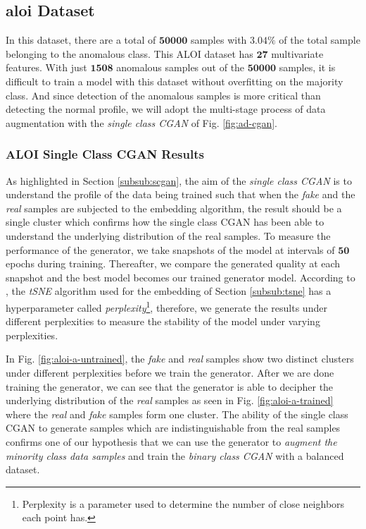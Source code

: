 \subsection{aloi Dataset}
\label{subsec:aloi}
In this dataset, there are a total of $ \bm{50000} $ samples with $ \bm{3.04\%} $ of the total sample belonging to the anomalous class. This ALOI dataset has $ \bm{27} $ multivariate features. With just $ \bm{1508} $ anomalous samples out of the $ \bm{50000} $ samples, it is difficult to train a model with this dataset without overfitting on the majority class. And since detection of the anomalous samples is more critical than detecting the normal profile, we will adopt the multi-stage process of data augmentation with the \textit{single class CGAN} of Fig. \ref{fig:ad-cgan}. 
\subsubsection{ALOI Single Class CGAN Results}
\label{subsub:aloiscgresults}
As highlighted in Section \ref{subsub:scgan}, the aim of the \textit{single class CGAN} is to understand the profile of the data being trained such that when the \textit{fake} and the \textit{real} samples are subjected to the embedding algorithm, the result should be a single cluster which confirms how the single class CGAN has been able to understand the underlying distribution of the real samples. To measure the performance of the generator, we take snapshots of the model at intervals of $ \bm{50} $ epochs during training. Thereafter, we compare the generated quality at each snapshot and the best model becomes our trained generator model. According to \cite{wattenberg2016how}, the \textit{tSNE} algorithm used for the embedding of Section \ref{subsub:tsne} has a hyperparameter called \textit{perplexity}\footnote{Perplexity is a parameter used to determine the number of close neighbors each point has.}, therefore, we generate the results under different perplexities to measure the stability of the model under varying perplexities. \par 
In Fig. \ref{fig:aloi-a-untrained}, the \textit{fake} and \textit{real} samples show two distinct clusters under different perplexities before we train the generator. After we are done training the generator, we can see that the generator is able to decipher the underlying distribution of the \textit{real} samples as seen in Fig. \ref{fig:aloi-a-trained} where the \textit{real} and \textit{fake} samples form one cluster. The ability of the single class CGAN to generate samples which are indistinguishable from the real samples confirms one of our hypothesis that we can use the generator to \textit{augment the minority class data samples} and train the \textit{binary class CGAN} with a balanced dataset.
